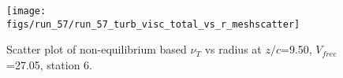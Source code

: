 \begin{figure}[H]
\centering
\texttt{[image: figs/run\_57/run\_57\_turb\_visc\_total\_vs\_r\_meshscatter]}
\caption{Scatter plot of non-equilibrium based $\nu_T$ vs radius at $z/c$=9.50, $V_{free}$=27.05, station 6.}
\label{fig:run_57_turb_visc_total_vs_r_meshscatter}
\end{figure}


